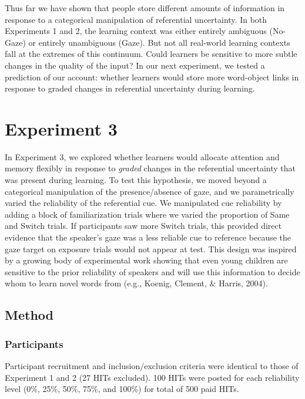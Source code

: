 \documentclass[authoryear, review]{elsarticle}
\begin{document}
Thus far we have shown that people store different amounts of
information in response to a categorical manipulation of referential
uncertainty. In both Experiments 1 and 2, the learning context was
either entirely ambiguous (No-Gaze) or entirely unambiguous (Gaze). But
not all real-world learning contexts fall at the extremes of this
continuum. Could learners be sensitive to more subtle changes in the
quality of the input? In our next experiment, we tested a prediction of
our account: whether learners would store more word-object links in
response to graded changes in referential uncertainty during learning.

\section{Experiment 3}\label{experiment-3}

In Experiment 3, we explored whether learners would allocate attention
and memory flexibly in response to \emph{graded} changes in the
referential uncertainty that was present during learning. To test this
hypothesis, we moved beyond a categorical manipulation of the
presence/absence of gaze, and we parametrically varied the reliability
of the referential cue. We manipulated cue reliability by adding a block
of familiarization trials where we varied the proportion of Same and
Switch trials. If participants saw more Switch trials, this provided
direct evidence that the speaker's gaze was a less reliable cue to
reference because the gaze target on exposure trials would not appear at
test. This design was inspired by a growing body of experimental work
showing that even young children are sensitive to the prior reliability
of speakers and will use this information to decide whom to learn novel
words from (e.g., Koenig, Clement, \& Harris, 2004).

\subsection{Method}\label{method-2}

\subsubsection{Participants}\label{participants-2}

Participant recruitment and inclusion/exclusion criteria were identical
to those of Experiment 1 and 2 (27 HITs excluded). 100 HITs were posted
for each reliability level (0\%, 25\%, 50\%, 75\%, and 100\%) for total
of 500 paid HITs.
\end{document}
